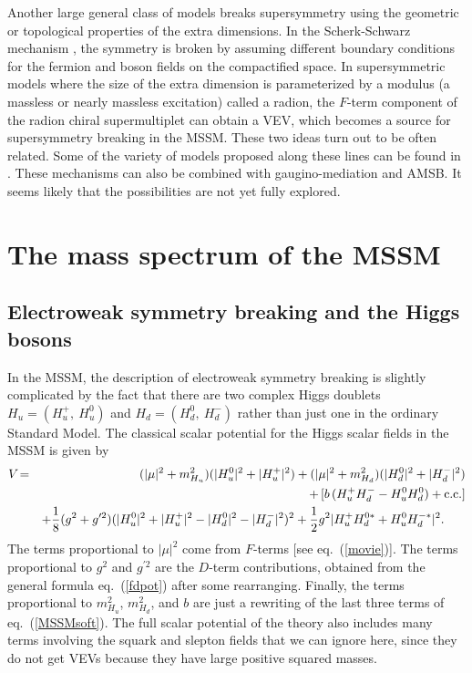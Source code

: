 \documentclass[11pt]{article}
\renewcommand{\theequation}{\arabic{section}.\arabic{equation}}
\def\beq{\begin{eqnarray}}
\def\eeq{\end{eqnarray}}
\def\conj{{{\rm c.c.}}}
\def\half{{1\over 2}}
\begin{document}
Another large general class of models breaks supersymmetry using the 
geometric or topological 
properties of the extra dimensions. In the Scherk-Schwarz 
mechanism \cite{ScherkSchwarz}, the symmetry is broken by 
assuming different boundary 
conditions for the fermion and boson fields on the compactified space. In 
supersymmetric models where the size of the extra dimension is 
parameterized by a modulus (a massless or nearly massless excitation) 
called a radion, the $F$-term component of the radion chiral 
supermultiplet can obtain a VEV, which becomes a source for supersymmetry 
breaking in the MSSM. These two ideas turn out to be often related. 
Some of the variety of models proposed along these lines can be found in 
\cite{SSandradion}. These mechanisms 
can also be combined with gaugino-mediation and AMSB. 
It seems likely that the possibilities are not yet fully explored.

\section{The mass spectrum of the MSSM}\label{sec:MSSMspectrum}
\renewcommand{\theequation}{\arabic{section}.\arabic{subsection}.\arabic{equation}}
\setcounter{equation}{0}
\setcounter{figure}{0}
\setcounter{table}{0}
\setcounter{footnote}{1}


\subsection{Electroweak symmetry breaking and the Higgs
bosons}\label{subsec:MSSMspectrum.Higgs}
\setcounter{equation}{0}
\setcounter{footnote}{1}

In the MSSM, the description of electroweak symmetry breaking is slightly 
complicated by the fact that there are two complex Higgs doublets $H_u = 
(H_u^+,\> H_u^0)$ and $H_d = (H_d^0,\> H_d^-)$ rather than just one in the 
ordinary Standard Model. The classical scalar potential for the Higgs 
scalar fields in the MSSM is given by
\beq
V\! &=&\!
(|\mu|^2 + m^2_{H_u}) (|H_u^0|^2 + |H_u^+|^2)
+ (|\mu|^2 + m^2_{H_d}) (|H_d^0|^2 + |H_d^-|^2)
\nonumber \\ &&
+\, [b\, (H_u^+ H_d^- - H_u^0 H_d^0) + \conj]
\nonumber \\ &&
+ {1\over 8} (g^2 + g^{\prime 2})
(|H_u^0|^2 + |H_u^+|^2 - |H_d^0|^2 - |H_d^-|^2 )^2
+ \half g^2 |H_u^+ H_d^{0*} + H_u^0 H_d^{-*}|^2 .
\phantom{xxx}
\label{bighiggsv}
\eeq
The terms proportional to $|\mu |^2$ come from $F$-terms [see 
eq.~(\ref{movie})].  The terms proportional to $g^2$ and $g^{\prime 2}$ 
are the $D$-term contributions, obtained from the general 
formula eq.~(\ref{fdpot}) after some rearranging. Finally, the terms 
proportional to $m_{H_u}^2$, $m_{H_d}^2$, and $b$ are just a 
rewriting of the last three terms of eq.~(\ref{MSSMsoft}). The full scalar 
potential of the theory also includes many terms involving the squark and 
slepton fields that we can ignore here, since they do not get VEVs because 
they have large positive squared masses.
\end{document}

